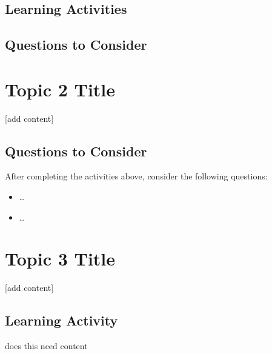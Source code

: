 \documentclass[
]{book}
\providecommand{\tightlist}{%
  \setlength{\itemsep}{0pt}\setlength{\parskip}{0pt}}
\begin{document}
\hypertarget{learning-activities-2}{%
\subsection*{Learning Activities}\label{learning-activities-2}}

\hypertarget{questions-to-consider-1}{%
\subsection*{Questions to Consider}\label{questions-to-consider-1}}

\hypertarget{topic-2-title}{%
\section{Topic 2 Title}\label{topic-2-title}}

{[}add content{]}

\hypertarget{questions-to-consider-2}{%
\subsection*{Questions to Consider}\label{questions-to-consider-2}}

After completing the activities above, consider the following questions:

\begin{itemize}
\tightlist
\item
  \ldots{}\\
\item
  \ldots{}
\end{itemize}

\hypertarget{topic-3-title}{%
\section{Topic 3 Title}\label{topic-3-title}}

{[}add content{]}

\hypertarget{learning-activity-2}{%
\subsection*{Learning Activity}\label{learning-activity-2}}

\begin{reflect}
does this need content
\end{reflect}
\end{document}
